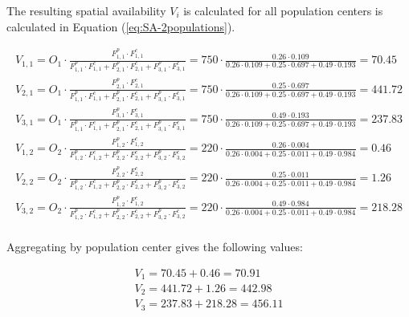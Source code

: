 \documentclass[]{elsarticle} %
\begin{document}
The resulting spatial availability \(V_{i}\) is calculated for all
population centers is calculated in Equation (\ref{eq:SA-2populations}).

\begin{equation}
\label{eq:SA-2populations}
\begin{array}{l}

V_{1,1} = O_1\cdot \frac{F^p_{1,1} \cdot F^c_{1,1}}{F^p_{1,1} \cdot F^c_{1,1} + F^p_{2,1} \cdot F^c_{2,1} + F^p_{3,1} \cdot F^c_{3,1}} = 
750 \cdot \frac{0.26 \cdot 0.109}{0.26 \cdot 0.109 + 0.25 \cdot 0.697 + 0.49 \cdot 0.193} = 70.45\\
V_{2,1} = O_1\cdot \frac{F^p_{2,1} \cdot F^c_{2,1}}{F^p_{1,1} \cdot F^c_{1,1} + F^p_{2,1} \cdot F^c_{2,1} + F^p_{3,1} \cdot F^c_{3,1}} = 
750 \cdot \frac{0.25 \cdot 0.697}{0.26 \cdot 0.109 + 0.25 \cdot 0.697 + 0.49 \cdot 0.193} = 441.72\\
V_{3,1} = O_1\cdot \frac{F^p_{3,1} \cdot F^c_{3,1}}{F^p_{1,1} \cdot F^c_{1,1} + F^p_{2,1} \cdot F^c_{2,1} + F^p_{3,1} \cdot F^c_{3,1}} = 
750 \cdot \frac{0.49 \cdot 0.193}{0.26 \cdot 0.109 + 0.25 \cdot 0.697 + 0.49 \cdot 0.193} = 237.83\\

V_{1,2} = O_2\cdot \frac{F^p_{1,2} \cdot F^c_{1,2}}{F^p_{1,2} \cdot F^c_{1,2} + F^p_{2,2} \cdot F^c_{2,2} + F^p_{3,2} \cdot F^c_{3,2}} = 
220 \cdot \frac{0.26 \cdot 0.004}{0.26 \cdot 0.004 + 0.25 \cdot 0.011 + 0.49 \cdot 0.984} = 0.46\\
V_{2,2} = O_2\cdot \frac{F^p_{2,2} \cdot F^c_{2,2}}{F^p_{1,2} \cdot F^c_{1,2} + F^p_{2,2} \cdot F^c_{2,2} + F^p_{3,2} \cdot F^c_{3,2}} = 
220 \cdot \frac{0.25 \cdot 0.011}{0.26 \cdot 0.004 + 0.25 \cdot 0.011 + 0.49 \cdot 0.984} = 1.26\\
V_{3,2} = O_2\cdot \frac{F^p_{1,2} \cdot F^c_{1,2}}{F^p_{1,2} \cdot F^c_{1,2} + F^p_{2,2} \cdot F^c_{2,2} + F^p_{3,2} \cdot F^c_{3,2}} = 
220 \cdot \frac{0.49 \cdot 0.984}{0.26 \cdot 0.004 + 0.25 \cdot 0.011 + 0.49 \cdot 0.984} = 218.28\\
\end{array}
\end{equation}

Aggregating by population center gives the following values:

\begin{equation}
\label{eq:SA-2populations-2}
\begin{array}{l}
V_{1} = 70.45 + 0.46 = 70.91\\
V_{2} = 441.72 + 1.26 = 442.98\\
V_{3} = 237.83 + 218.28 = 456.11\\
\end{array}
\end{equation}
\end{document}
